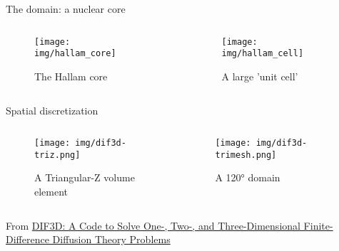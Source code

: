 \documentclass[pdf,aspectratio=169]{beamer}
\begin{document}
\begin{frame}{The domain: a nuclear core}
\begin{columns}
    \begin{column}{0.5\textwidth}
        \begin{figure}[ht]
        \centering
        \texttt{[image: img/hallam\_core]}
            \caption{\small The Hallam core}
        \end{figure}
    \end{column}
    \begin{column}{0.5\textwidth}
        \begin{figure}[ht]
        \centering
        \texttt{[image: img/hallam\_cell]}
        \caption{\small A large 'unit cell'}
        \end{figure}
    \end{column}
\end{columns}
\end{frame}

\begin{frame}{Spatial discretization}
\begin{columns}
    \begin{column}{0.5\textwidth}
        \begin{figure}[ht]
        \centering
        \texttt{[image: img/dif3d-triz.png]}
        \caption{\small A Triangular-Z volume element}
        \end{figure}
    \end{column}
    \begin{column}{0.5\textwidth}
        \begin{figure}[ht]
        \centering
        \texttt{[image: img/dif3d-trimesh.png]}
        \caption{\small A 120° domain}
        \end{figure}
    \end{column}
\end{columns}
    \centering \tiny From \href{https://digital.library.unt.edu/ark:/67531/metadc283553/}{DIF3D: A Code to Solve One-, Two-, and Three-Dimensional
    Finite-Difference Diffusion Theory
    Problems}
\end{frame}
\end{document}
